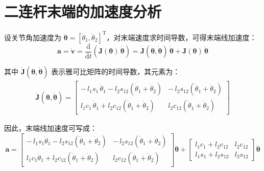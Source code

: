 \documentclass{ctexart}
\begin{document}
\section*{二连杆末端的加速度分析}

设关节角加速度为 $\boldsymbol{\ddot{\theta}} = [\ddot{\theta}_1, \ddot{\theta}_2]^\mathrm{T}$，对末端速度求时间导数，可得末端线加速度：
\begin{equation*}
  \boldsymbol{a} = \dot{\boldsymbol{v}} = \frac{\mathrm{d}}{\mathrm{d}t}\left(\boldsymbol{J}(\boldsymbol{\theta})\, \boldsymbol{\dot{\theta}}\right)
  = \dot{\boldsymbol{J}}(\boldsymbol{\theta}, \boldsymbol{\dot{\theta}})\, \boldsymbol{\dot{\theta}} + \boldsymbol{J}(\boldsymbol{\theta})\, \boldsymbol{\ddot{\theta}}
\end{equation*}

其中 $\dot{\boldsymbol{J}}(\boldsymbol{\theta}, \boldsymbol{\dot{\theta}})$ 表示雅可比矩阵的时间导数，其元素为：
\begin{align*}
  \dot{\boldsymbol{J}}(\boldsymbol{\theta}, \boldsymbol{\dot{\theta}}) =
  \begin{bmatrix}
    -\,l_1 s_1 \, \dot{\theta}_1 - l_2 s_{12} (\dot{\theta}_1+\dot{\theta}_2) & -\,l_2 s_{12} (\dot{\theta}_1+\dot{\theta}_2) \\
    l_1 c_1 \, \dot{\theta}_1 + l_2 c_{12} (\dot{\theta}_1+\dot{\theta}_2)    & l_2 c_{12} (\dot{\theta}_1+\dot{\theta}_2)
  \end{bmatrix}
\end{align*}

因此，末端线加速度可写成：
\begin{equation*}
  \boldsymbol{a} =
  \begin{bmatrix}
    -\,l_1 s_1 \dot{\theta}_1 - l_2 s_{12} (\dot{\theta}_1+\dot{\theta}_2) & -\,l_2 s_{12} (\dot{\theta}_1+\dot{\theta}_2) \\
    l_1 c_1 \dot{\theta}_1 + l_2 c_{12} (\dot{\theta}_1+\dot{\theta}_2)    & l_2 c_{12} (\dot{\theta}_1+\dot{\theta}_2)
  \end{bmatrix} \boldsymbol{\dot{\theta}}
  +
  \begin{bmatrix}
    l_1 c_1 + l_2 c_{12} & l_2 c_{12} \\
    l_1 s_1 + l_2 s_{12} & l_2 s_{12}
  \end{bmatrix} \boldsymbol{\ddot{\theta}}
\end{equation*}
\end{document}
